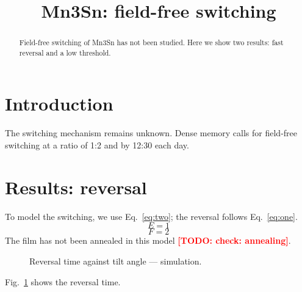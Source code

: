 \documentclass{article}
\begin{document}
\title{Mn3Sn: field-free switching}
\begin{abstract}
Field-free switching of Mn3Sn has not been studied.
Here we show two results: fast reversal and a low threshold.
\end{abstract}

\section{Introduction}
The switching mechanism remains unknown.
Dense memory calls for field-free switching at a ratio of 1:2 and by 12:30 each day.

\section{Results: reversal}
To model the switching, we use Eq.~\eqref{eq:two}; the reversal follows Eq.~\eqref{eq:one}.
\begin{equation}
E = 1 \label{eq:one}
\end{equation}
\begin{equation}
F = 2 \label{eq:two}
\end{equation}
The film has not been annealed in this model \textcolor{red}{\textbf{[TODO: check: annealing]}}.

\begin{figure}
\caption{Reversal time against tilt angle --- simulation.}
\label{fig:1}
\end{figure}
Fig.~\ref{fig:1} shows the reversal time.
\end{document}
